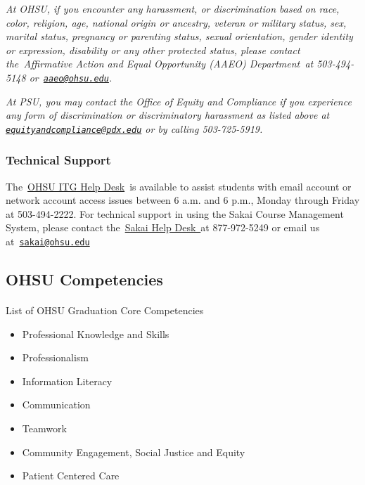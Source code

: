 \documentclass[
  letterpaper,
  DIV=11,
  numbers=noendperiod]{scrartcl}
\makeatletter
\let\oldparagraph\paragraph
\renewcommand{\paragraph}{
    \@ifstar
      \xxxParagraphStar
      \xxxParagraphNoStar
  }
\newcommand{\xxxParagraphStar}[1]{\oldparagraph*{#1}\mbox{}}
\newcommand{\xxxParagraphNoStar}[1]{\oldparagraph{#1}\mbox{}}
\makeatother
\begin{document}
\emph{At OHSU, if you encounter any harassment, or discrimination based
on race, color, religion, age, national origin or ancestry, veteran or
military status, sex, marital status, pregnancy or parenting status,
sexual orientation, gender identity or expression, disability or any
other protected status, please contact the~Affirmative Action and Equal
Opportunity (AAEO) Department~at 503-494-5148
or~\href{mailto:aaeo@ohsu.edu}{\nolinkurl{aaeo@ohsu.edu}}.}

\emph{At PSU, you may contact the Office of Equity and Compliance if you
experience any form of discrimination or discriminatory harassment as
listed above at
\href{mailto:equityandcompliance@pdx.edu}{\nolinkurl{equityandcompliance@pdx.edu}}
or by calling 503-725-5919.}

\subsubsection{Technical Support}\label{technical-support}

The~\href{http://www.ohsu.edu/xd/about/services/information-technology/contact-us/index.cfm}{OHSU
ITG Help Desk}~is available to assist students with email account or
network account access issues between 6 a.m. and 6 p.m., Monday through
Friday at 503-494-2222. For technical support in using the Sakai Course
Management System, please contact
the~\href{https://www.ohsu.edu/xd/education/teaching-and-learning-center/tools-and-services/sakai.cfm}{Sakai
Help Desk~}at 877-972-5249 or email us
at~\href{mailto:sakai@ohsu.edu}{\nolinkurl{sakai@ohsu.edu}}

\subsection{OHSU Competencies}\label{ohsu-competencies}

\paragraph{List of OHSU Graduation Core
Competencies}\label{list-of-ohsu-graduation-core-competencies}

\begin{itemize}
\item
  Professional Knowledge and Skills
\item
  Professionalism
\item
  Information Literacy
\item
  Communication
\item
  Teamwork
\item
  Community Engagement, Social Justice and Equity
\item
  Patient Centered Care
\end{itemize}
\end{document}
